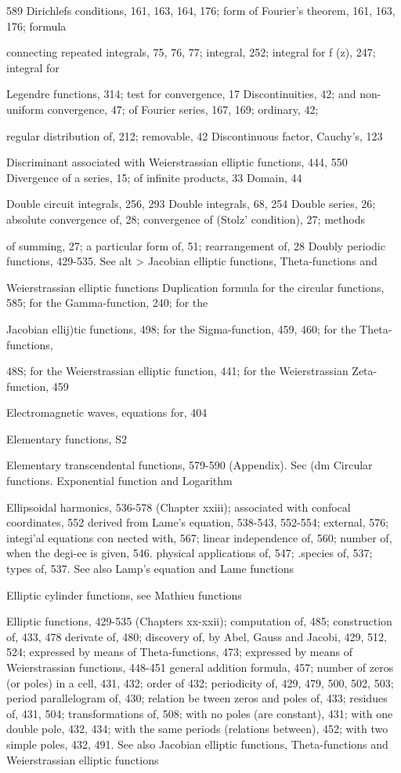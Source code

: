 589
Dirichlefs conditions, 161, 163, 164, 176; form of Fourier's theorem, 161, 163, 176; formula

connecting repeated integrals, 75, 76, 77; integral, 252; integral for f (z), 247; integral for

Legendre functions, 314; test for convergence, 17
Discontinuities, 42; and non-uniform convergence, 47; of Fourier series, 167, 169; ordinary, 42;

regular distribution of, 212; removable, 42
Discontinuous factor, Cauchy's, 123

Discriminant associated with Weierstrassian elliptic functions, 444, 550
Divergence of a series, 15; of infinite products, 33
Domain, 44

Double circuit integrals, 256, 293
Double integrals, 68, 254
Double series, 26; absolute convergence of, 28; convergence of (Stolz' condition), 27; methods

of summing, 27; a particular form of, 51; rearrangement of, 28
Doubly periodic functions, 429-535. See alt > Jacobian elliptic functions, Theta-functions and

Weierstrassian elliptic functions
Duplication formula for the circular functions, 585; for the Gamma-function, 240; for the

Jacobian ellij)tic functions, 498; for the Sigma-function, 459, 460; for the Theta-functions,

48S; for the Weierstrassian elliptic function, 441; for the Weierstrassian Zeta-function, 459

Electromagnetic waves, equations for, 404

Elementary functions, S2

Elementary transcendental functions, 579-590 (Appendix). Sec (dm Circular functions.
Exponential function and Logarithm

Ellipsoidal harmonics, 536-578 (Chapter xxiii); associated with confocal coordinates, 552
derived from Lame's equation, 538-543, 552-554; external, 576; integi'al equations con
nected with, 567; linear independence of, 560; number of, when the degi-ee is given, 546.
physical applications of, 547; .species of, 537; types of, 537. See also Lamp's equation
and Lame functions

Elliptic cylinder functions, see Mathieu functions

Elliptic functions, 429-535 (Chapters xx-xxii); computation of, 485; construction of, 433, 478
derivate of, 480; discovery of, by Abel, Gauss and Jacobi, 429, 512, 524; expressed by
means of Theta-functions, 473; expressed by means of Weierstrassian functions, 448-451
general addition formula, 457; number of zeros (or poles) in a cell, 431, 432; order of
432; periodicity of, 429, 479, 500, 502, 503; period parallelogram of, 430; relation be
tween zeros and poles of, 433; residues of, 431, 504; transformations of, 508; with no
poles (are constant), 431; with one double pole, 432, 434; with the same periods (relations
between), 452; with two simple poles, 432, 491. See also Jacobian elliptic functions,
Theta-functions and Weierstrassian elliptic functions

